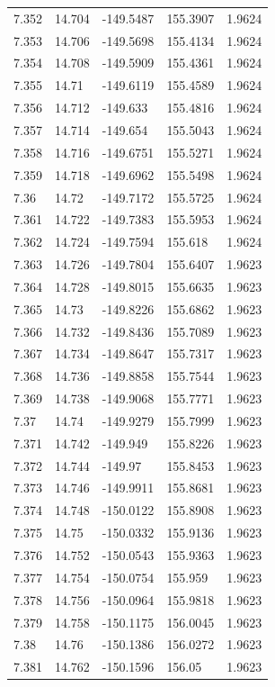 \begin{tabular}{lllll}
7.352 & 14.704 & -149.5487 & 155.3907 & 1.9624 \\
7.353 & 14.706 & -149.5698 & 155.4134 & 1.9624 \\
7.354 & 14.708 & -149.5909 & 155.4361 & 1.9624 \\
7.355 & 14.71 & -149.6119 & 155.4589 & 1.9624 \\
7.356 & 14.712 & -149.633 & 155.4816 & 1.9624 \\
7.357 & 14.714 & -149.654 & 155.5043 & 1.9624 \\
7.358 & 14.716 & -149.6751 & 155.5271 & 1.9624 \\
7.359 & 14.718 & -149.6962 & 155.5498 & 1.9624 \\
7.36 & 14.72 & -149.7172 & 155.5725 & 1.9624 \\
7.361 & 14.722 & -149.7383 & 155.5953 & 1.9624 \\
7.362 & 14.724 & -149.7594 & 155.618 & 1.9624 \\
7.363 & 14.726 & -149.7804 & 155.6407 & 1.9623 \\
7.364 & 14.728 & -149.8015 & 155.6635 & 1.9623 \\
7.365 & 14.73 & -149.8226 & 155.6862 & 1.9623 \\
7.366 & 14.732 & -149.8436 & 155.7089 & 1.9623 \\
7.367 & 14.734 & -149.8647 & 155.7317 & 1.9623 \\
7.368 & 14.736 & -149.8858 & 155.7544 & 1.9623 \\
7.369 & 14.738 & -149.9068 & 155.7771 & 1.9623 \\
7.37 & 14.74 & -149.9279 & 155.7999 & 1.9623 \\
7.371 & 14.742 & -149.949 & 155.8226 & 1.9623 \\
7.372 & 14.744 & -149.97 & 155.8453 & 1.9623 \\
7.373 & 14.746 & -149.9911 & 155.8681 & 1.9623 \\
7.374 & 14.748 & -150.0122 & 155.8908 & 1.9623 \\
7.375 & 14.75 & -150.0332 & 155.9136 & 1.9623 \\
7.376 & 14.752 & -150.0543 & 155.9363 & 1.9623 \\
7.377 & 14.754 & -150.0754 & 155.959 & 1.9623 \\
7.378 & 14.756 & -150.0964 & 155.9818 & 1.9623 \\
7.379 & 14.758 & -150.1175 & 156.0045 & 1.9623 \\
7.38 & 14.76 & -150.1386 & 156.0272 & 1.9623 \\
7.381 & 14.762 & -150.1596 & 156.05 & 1.9623 \\

\end{tabular}
